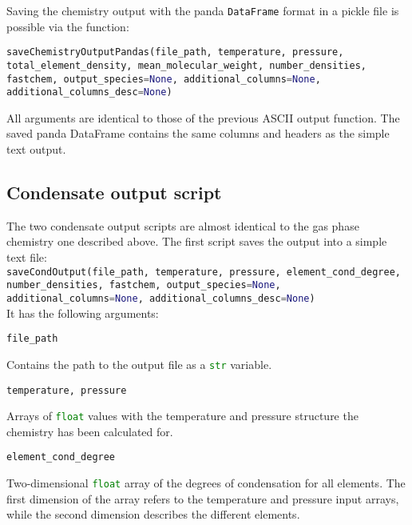 \documentclass[numbers=noenddot]{aux/fcmanual}
\begin{document}
Saving the chemistry output with the panda \lstinline[language=Python]!DataFrame! format in a pickle file is possible via the function:

\bigbreak

\lstinline[language=Python, breaklines, breakatwhitespace]!saveChemistryOutputPandas(file_path, temperature, pressure, total_element_density, mean_molecular_weight, number_densities, fastchem, output_species=None, additional_columns=None, additional_columns_desc=None)!

\bigbreak

All arguments are identical to those of the previous ASCII output function. The saved panda DataFrame contains the same columns and headers as the simple text output.



\subsection{Condensate output script}

The two condensate output scripts are almost identical to the gas phase chemistry one described above. The first script saves the output into a simple text file:\\

\lstinline[language=Python, breaklines, breakatwhitespace]!saveCondOutput(file_path, temperature, pressure, element_cond_degree, number_densities, fastchem, output_species=None, additional_columns=None, additional_columns_desc=None)!\\

It has the following arguments:

\bigbreak

\lstinline[language=Python]!file_path!
\begin{addmargin}[25pt]{0pt}
	Contains the path to the output file as a \lstinline[language=Python]!str! variable.
\end{addmargin}


\bigbreak

\lstinline[language=Python]!temperature, pressure!
\begin{addmargin}[25pt]{0pt}
	Arrays of \lstinline[language=Python]!float! values with the temperature and pressure structure the chemistry has been calculated for.
\end{addmargin}

\bigbreak

\lstinline[language=Python]!element_cond_degree!
\begin{addmargin}[25pt]{0pt}
	Two-dimensional \lstinline[language=Python]!float! array of the degrees of condensation for all elements. The first dimension of the array refers to the temperature and pressure input arrays, while the second dimension describes the different elements.
\end{addmargin}
\end{document}
